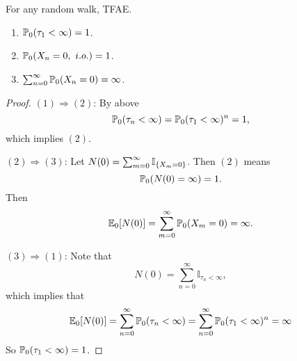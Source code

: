\begin{exam}
    \begin{thm}
        For any random walk, TFAE.
        \begin{enumerate}[label=(\arabic{*})]
            \item $\mathbb{P}_0(\tau_1 < \infty) = 1$.
            \item $\mathbb{P}_0(X_n = 0,~i.o.) = 1$.
            \item $\sum_{n=0}^\infty \mathbb{P}_0(X_n = 0) = \infty$.
        \end{enumerate}
    \end{thm}
    \begin{proof}
        \noindent $(1) \Rightarrow (2)$: By above
        \begin{equation*}
            \mathbb{P}_0(\tau_n < \infty) = \mathbb{P}_0(\tau_1 < \infty)^n = 1,
        \end{equation*}
        which implies $(2)$.

        \noindent $(2) \Rightarrow (3)$: Let $N(0) = \sum_{m=0}^\infty \mathbb{I}_{\left\{X_m = 0\right\}}$. Then $(2)$ means
        \begin{equation*}
            \mathbb{P}_0(N(0) = \infty) = 1.
        \end{equation*}
        Then
        \begin{equation*}
            \mathbb{E}_0[N(0)] = \sum_{m=0}^\infty \mathbb{P}_0(X_m = 0) = \infty.
        \end{equation*}

        \noindent $(3) \Rightarrow (1)$: Note that
        \begin{equation*}
            N(0) = \sum_{n=0}^\infty \mathbb{I}_{\tau_n < \infty},
        \end{equation*}
        which implies that
        \begin{equation*}
            \mathbb{E}_0[N(0)] = \sum_{n=0}^\infty \mathbb{P}_0(\tau_n < \infty) = \sum_{n=0}^\infty \mathbb{P}_0(\tau_1 < \infty)^n =\infty
        \end{equation*}
        So $\mathbb{P}_0(\tau_1 < \infty) = 1$.
    \end{proof}


\end{exam}
